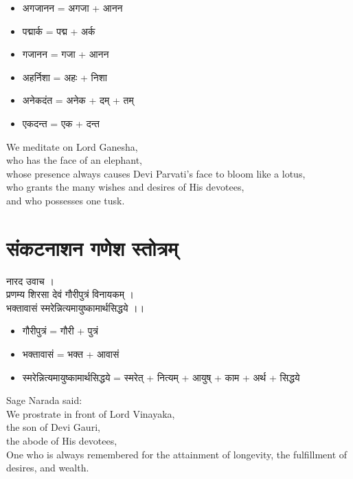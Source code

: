 \documentclass{book}
\newenvironment{Verse}[1][]
  {\bigskip\noindent\begin{center}\begin{adjustbox}{valign=M}\begin{tcolorbox}[colframe=black,colback=white,boxrule=0.5mm,arc=4mm,auto outer arc,left=2mm,right=2mm,top=2mm,bottom=2mm,halign=center]
  \LARGE\bfseries#1\par\varwidth{\linewidth}\centering}
  {\endvarwidth\end{tcolorbox}\end{adjustbox}\end{center}\bigskip}
\begin{document}
\begin{multicols}{2}
    \setlength{\columnseprule}{0.4pt}
    \begin{itemize}
        \item अगजानन = अगजा + आनन
        \item पद्मार्क = पद्म + अर्क
        \item गजानन = गजा + आनन
        \item अहर्निशा = अहः + निशा
        \item अनेकदंत = अनेक + दम्  + तम्
        \item एकदन्त = एक + दन्त
    \end{itemize}

    \columnbreak
    
    \vspace{10pt}
    \textenglish{
        \noindent We meditate on Lord Ganesha,\\
        who has the face of an elephant,\\
        whose presence always causes Devi Parvati's face to bloom like a lotus,\\
        who grants the many wishes and desires of His devotees,\\
        and who possesses one tusk.
    }

\end{multicols}

\clearpage

\section{संकटनाशन गणेश स्तोत्रम्}

\begin{Verse}
    नारद उवाच ।\\
    प्रणम्य शिरसा देवं गौरीपुत्रं विनायकम् ।\\
    भक्तावासं स्मरेन्नित्यमायुष्कामार्थसिद्धये ।।
\end{Verse}


\begin{multicols}{2}
    \setlength{\columnseprule}{0.4pt}
    \begin{itemize}
        \item गौरीपुत्रं = गौरी + पुत्रं
        \item भक्तावासं = भक्त + आवासं
        \item स्मरेन्नित्यमायुष्कामार्थसिद्धये = स्मरेत् + नित्यम् + आयुष् + काम + अर्थ + सिद्धये
    \end{itemize}

    \columnbreak
    
    \vspace{10pt}
    \textenglish{
        \noindent Sage Narada said:\\
        We prostrate in front of Lord Vinayaka,\\
        the son of Devi Gauri,\\
        the abode of His devotees,\\
        One who is always remembered for the attainment of longevity, the fulfillment of desires, and wealth.
    }

\end{multicols}
\end{document}
